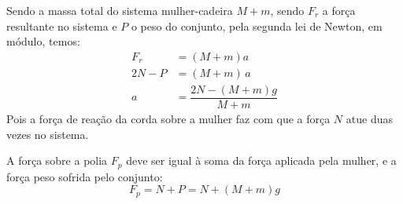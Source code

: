 \documentclass[]{IMTexam}
\begin{document}
\begin{questions}
\begin{solution}
		\begin{multi}
			\begin{unindent}
				\item Sendo a massa total do sistema mulher-cadeira $ M+m $, sendo $ F_r $ a força resultante no sistema e $ P $ o peso do conjunto, pela segunda lei de Newton, em módulo, temos:
				\begin{align}
					F_r  & =(M+m)a\nonumber                               \\
					2N-P & =(M+m)\,a\nonumber                             \\
					a    & =\dfrac{2N-(M+m)g}{M+m} \label{eq:aWomanChair}
				\end{align}
				Pois a força de reação da corda sobre a mulher faz com que a força $ N $ atue duas vezes no sistema.
				\item A força sobre a polia $ F_p $ deve ser igual à soma da força aplicada pela mulher, e a força peso sofrida pelo conjunto:
				\begin{equation}\label{eq:FpWC}
					F_p=N+P=N+(M+m)g
				\end{equation}
			\end{unindent}

			\nextcol

			\centering
\end{multi}
\end{solution}
\end{questions}
\end{document}
